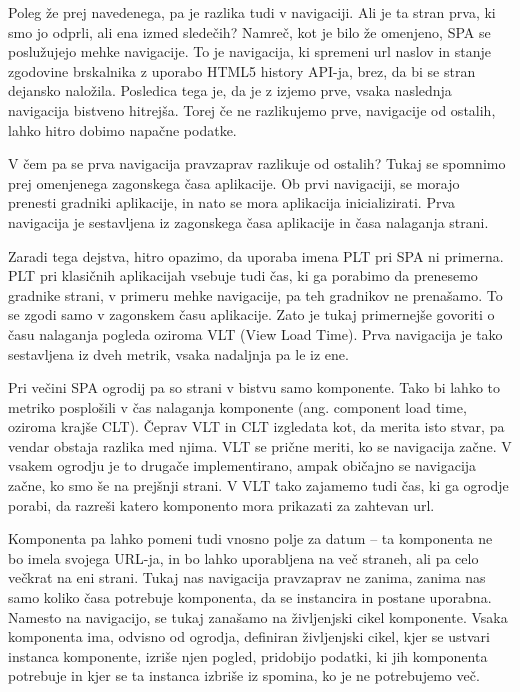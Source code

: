 \documentclass[a4paper, 12pt]{book}
\begin{document}
Poleg že prej navedenega, pa je razlika tudi v navigaciji. Ali je ta stran prva, ki smo jo odprli, ali ena izmed sledečih? Namreč, kot je bilo že omenjeno, SPA se poslužujejo mehke navigacije. To je navigacija, ki spremeni url naslov in stanje zgodovine brskalnika z uporabo HTML5 history API-ja, brez, da bi se stran dejansko naložila. Posledica tega je, da je z izjemo prve, vsaka naslednja navigacija bistveno hitrejša. Torej če ne razlikujemo prve,  navigacije od ostalih, lahko hitro dobimo napačne podatke.

V čem pa se prva navigacija pravzaprav razlikuje od ostalih? Tukaj se spomnimo prej omenjenega zagonskega časa aplikacije. Ob prvi navigaciji, se morajo prenesti gradniki aplikacije, in nato se mora aplikacija inicializirati. Prva navigacija je sestavljena iz zagonskega časa aplikacije in časa nalaganja strani.

Zaradi tega dejstva, hitro opazimo, da uporaba imena PLT pri SPA ni primerna. PLT pri klasičnih aplikacijah vsebuje tudi čas, ki ga porabimo da prenesemo gradnike strani, v primeru mehke navigacije, pa teh gradnikov ne prenašamo. To se zgodi samo v zagonskem času aplikacije. Zato je tukaj primernejše govoriti o času nalaganja pogleda oziroma VLT (View Load Time). Prva navigacija je tako sestavljena iz dveh metrik, vsaka nadaljnja pa le iz ene.

Pri večini SPA ogrodij pa so strani v bistvu samo komponente. Tako bi lahko to metriko posplošili v čas nalaganja komponente (ang. component load time, oziroma krajše CLT). Čeprav VLT in CLT izgledata kot, da merita isto stvar, pa vendar obstaja razlika med njima. VLT se prične meriti, ko se navigacija začne. V vsakem ogrodju je to drugače implementirano, ampak običajno se navigacija začne, ko smo še na prejšnji strani. V VLT tako zajamemo tudi čas, ki ga ogrodje porabi, da razreši katero komponento mora prikazati za zahtevan url.

Komponenta pa lahko pomeni tudi vnosno polje za datum -- ta komponenta ne bo imela svojega URL-ja, in bo lahko uporabljena na več straneh, ali pa celo večkrat na eni strani. Tukaj nas navigacija pravzaprav ne zanima, zanima nas samo koliko časa potrebuje komponenta, da se instancira in postane uporabna. Namesto na navigacijo, se tukaj zanašamo na življenjski cikel komponente. Vsaka komponenta ima, odvisno od ogrodja, definiran življenjski cikel, kjer se ustvari instanca komponente, izriše njen pogled, pridobijo podatki, ki jih komponenta potrebuje in kjer se ta instanca izbriše iz spomina, ko je ne potrebujemo več.
\end{document}
